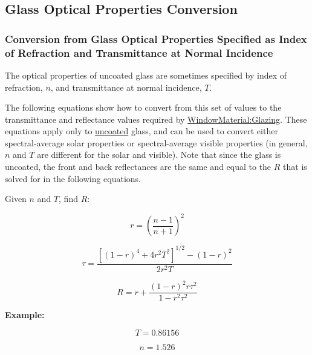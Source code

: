 \subsection{Glass Optical Properties Conversion}\label{glass-optical-properties-conversion}

\subsubsection{Conversion from Glass Optical Properties Specified as Index of Refraction and Transmittance at Normal Incidence}\label{conversion-from-glass-optical-properties-specified-as-index-of-refraction-and-transmittance-at-normal-incidence}

The optical properties of uncoated glass are sometimes specified by index of refraction, $n$, and transmittance at normal incidence, $T$.

The following equations show how to convert from this set of values to the transmittance and reflectance values required by \hyperref[windowmaterialglazing]{WindowMaterial:Glazing}. These equations apply only to \underline{uncoated} glass, and can be used to convert either spectral-average solar properties or spectral-average visible properties (in general, \(n\) and \(T\) are different for the solar and visible). Note that since the glass is uncoated, the front and back reflectances are the same and equal to the \(R\) that is solved for in the following equations.

Given \(n\) and \(T\), find \(R\):

\begin{equation*}
r = \left( \frac{n - 1}{n + 1} \right)^2
\end{equation*}

\begin{equation*}
\tau = \frac{ \left[ (1 - r)^4 + 4 r^2 T^2 \right]^{1/2} - (1 - r)^2}{2 r^2 T}
\end{equation*}

\begin{equation*}
R = r + \frac{(1 - r)^2 r \tau ^2}{1 - r^2 \tau ^2}
\end{equation*}

\textbf{Example:}

\begin{equation*}
T = 0.86156
\end{equation*}

\begin{equation*}
n = 1.526
\end{equation*}

